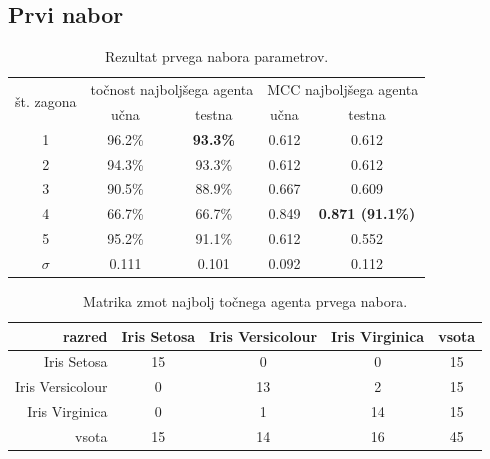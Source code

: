 \subsection{Prvi nabor}\label{subsec:dodatek-iris-prvi-nabor}
\begin{table}[H]
    \begin{center}
        \begin{tabular}{|| c | c c || c c ||}
            \hline
            \multirow{2}{*}{št. zagona} & \multicolumn{2}{c||}{točnost najboljšega agenta} & \multicolumn{2}{c||}{MCC najboljšega agenta} \\ \cline{2-5}
            & učna    & testna           & učna  & testna         \\
            \hline
            1        & 96.2\% & \textbf{93.3\%} & 0.612 & 0.612          \\
            \hline
            2        & 94.3\% & 93.3\%          & 0.612 & 0.612          \\
            \hline
            3        & 90.5\% & 88.9\%          & 0.667 & 0.609          \\
            \hline
            4        & 66.7\% & 66.7\%          & 0.849 & \textbf{0.871 (91.1\%)} \\
            \hline
            5        & 95.2\% & 91.1\%          & 0.612 & 0.552          \\
            \hline
            $\sigma$ & 0.111   & 0.101            & 0.092 & 0.112          \\
            \hline
        \end{tabular}
    \end{center}
    \caption{Rezultat prvega nabora parametrov.}
    \label{tab:iris_result_1}
\end{table}

\begin{table}[H]
    \centering
    \begin{tabular}{||rcccc||}
        \hline
        razred           & Iris Setosa & Iris Versicolour & Iris Virginica & vsota \\ \hline
        Iris Setosa      & 15          & 0                & 0              & 15    \\ \hline
        Iris Versicolour & 0           & 13               & 2              & 15    \\ \hline
        Iris Virginica   & 0           & 1                & 14             & 15    \\ \hline
        vsota            & 15          & 14               & 16             & 45    \\ \hline
    \end{tabular}
    \caption{Matrika zmot najbolj točnega agenta prvega nabora.}
    \label{tab:iris_acc_1}
\end{table}

